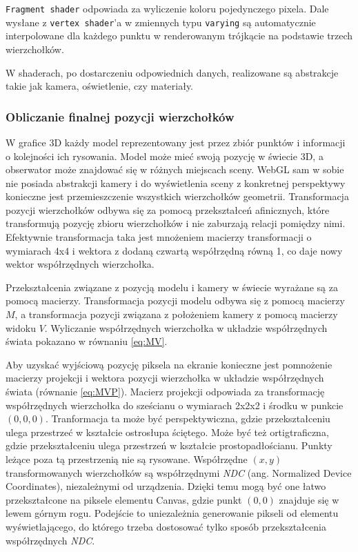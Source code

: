\texttt{Fragment shader} odpowiada za wyliczenie koloru pojedynczego pixela. Dale wysłane z \texttt{vertex shader}'a w zmiennych typu \texttt{varying} są automatycznie interpolowane dla każdego punktu w renderowanym trójkącie na podstawie trzech wierzchołków.

W shaderach, po dostarczeniu odpowiednich danych, realizowane są abstrakcje takie jak kamera, oświetlenie, czy materiały.

\subsubsection{Obliczanie finalnej pozycji wierzchołków}

W grafice 3D każdy model reprezentowany jest przez zbiór punktów i informacji o kolejności ich rysowania. Model może mieć swoją pozycję w świecie 3D, a obserwator może znajdować się w różnych miejscach sceny. WebGL sam w sobie nie posiada abstrakcji kamery i do wyświetlenia sceny z konkretnej perspektywy konieczne jest przemieszczenie wszystkich wierzchołków geometrii. Transformacja pozycji wierzchołków odbywa się za pomocą przekształceń afinicznych, które transformują pozycję zbioru wierzchołków i nie zaburzają relacji pomiędzy nimi. Efektywnie transformacja taka jest mnożeniem macierzy transformacji o wymiarach 4x4 i wektora z dodaną czwartą współrzędną równą 1, co daje nowy wektor współrzędnych wierzchołka.

Przekształcenia związane z pozycją modelu i kamery w świecie wyrażane są za pomocą macierzy. Transformacja pozycji modelu odbywa się z pomocą macierzy $M$, a transformacja pozycji związana z położeniem kamery z pomocą macierzy widoku $V$. Wyliczanie współrzędnych wierzchołka w układzie współrzędnych świata pokazano w równaniu \ref{eq:MV}.

Aby uzyskać wyjściową pozycję piksela na ekranie konieczne jest pomnożenie macierzy projekcji i wektora pozycji wierzchołka w układzie współrzędnych świata (równanie \ref{eq:MVP}). Macierz projekcji odpowiada za transformację współrzędnych wierzchołka do sześcianu o wymiarach 2x2x2 i środku w punkcie $(0, 0, 0)$. Tranformacja ta może być perspektywiczna, gdzie przekształceniu ulega przestrzeć w kształcie ostrosłupa ściętego. Może być też ortigtraficzna, gdzie przekształceniu ulega przestrzeń w kształcie prostopadłościanu. Punkty leżące poza tą przestrzenią nie są rysowane. Współrzędne $(x, y)$ transformowanych wierzchołków są współrzędnymi \textit{NDC} (ang. Normalized Device Coordinates), niezależnymi od urządzenia. Dzięki temu mogą być one łatwo przekształcone na piksele elementu Canvas, gdzie punkt $(0, 0)$ znajduje się w lewem górnym rogu. Podejście to uniezależnia generowanie pikseli od elementu wyświetlającego, do którego trzeba dostosować tylko sposób przekształcenia współrzędnych \textit{NDC}.

